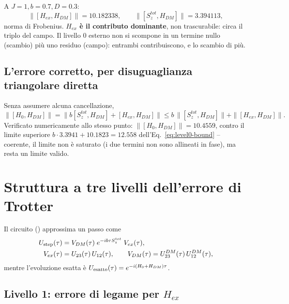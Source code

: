 \documentclass[11pt,a4paper]{article}
\begin{document}
A $J=1,b=0.7,D=0.3$:
\begin{equation}
\|[H_{ex},H_{DM}]\| = 10.182338, \qquad \|[S_z^{tot},H_{DM}]\| = 3.394113,
\end{equation}
norma di Frobenius. \textbf{$H_{ex}$ è il contributo dominante}, non trascurabile: circa il triplo del campo. Il livello 0 esterno non si scompone in un termine nullo (scambio) più uno residuo (campo): entrambi contribuiscono, e lo scambio di più.

\subsection{L'errore corretto, per disuguaglianza triangolare diretta}

Senza assumere alcuna cancellazione,
\begin{equation}
\big\|[H_0,H_{DM}]\big\| = \big\|b[S_z^{tot},H_{DM}]+[H_{ex},H_{DM}]\big\| \le b\,\|[S_z^{tot},H_{DM}]\|+\|[H_{ex},H_{DM}]\|.
\label{eq:level0-bound}
\end{equation}
Verificato numericamente allo stesso punto: $\|[H_0,H_{DM}]\|=10.4559$, contro il limite superiore $b\cdot3.3941+10.1823=12.558$ dell'Eq.~\eqref{eq:level0-bound} -- coerente, il limite non è saturato (i due termini non sono allineati in fase), ma resta un limite valido.

\section{Struttura a tre livelli dell'errore di Trotter}
\label{sec:trotter-error}

Il circuito (\texttt{}) approssima un passo come
\begin{align}
U_{\rm step}(\tau) &= V_{DM}(\tau)\;e^{-ib\tau S_z^{tot}}\;V_{ex}(\tau), \label{eq:Ustep-def}\\
V_{ex}(\tau)&=U_{23}(\tau)\,U_{12}(\tau), \qquad V_{DM}(\tau)=U_{23}^{DM}(\tau)\,U_{12}^{DM}(\tau), \notag
\end{align}
mentre l'evoluzione esatta è $U_{\rm esatto}(\tau)=e^{-i(H_0+H_{DM})\tau}$.

\subsection{Livello 1: errore di legame per $H_{ex}$}
\end{document}
